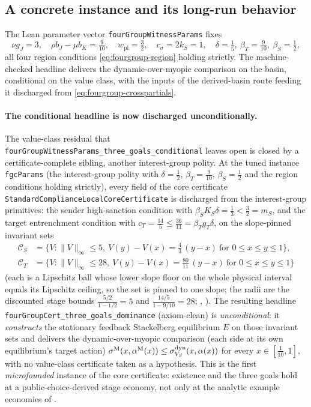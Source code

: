 \subsection{A concrete instance and its long-run behavior}
\label{sec:fourgroup:instance}

The Lean parameter vector \texttt{fourGroupWitnessParams} fixes
\begin{equation}
\nu g_J=3,
\quad
\rho b_J-\mu b_K=\tfrac{9}{10},
\quad
w_{\mathrm{pl}}=\tfrac{3}{2},
\quad
c_\sigma=2k_S=1,
\quad
\delta=\tfrac15,\ \beta_T=\tfrac{9}{10},\ \beta_S=\tfrac12,
\end{equation}
all four region conditions \eqref{eq:fourgroup-region} holding
strictly. The
machine-checked headline
 delivers
the dynamic-over-myopic comparison on the basin, conditional on the value class, with
the inputs of the derived-basin route feeding it discharged from
\eqref{eq:fourgroup-crosspartials}.

\paragraph{The conditional headline is now discharged unconditionally.}
The value-class residual that
\texttt{fourGroupWitnessParams\_three\_goals\_conditional} leaves open
is closed by a certificate-complete sibling, another interest-group
polity. At the tuned instance \texttt{fgcParams} (the
\citet{GrossmanHelpman1994} interest-group polity with $\delta=\tfrac12$,
$\beta_T=\tfrac{9}{10}$, $\beta_S=\tfrac12$ and the region conditions
holding strictly), every field of the core certificate
\texttt{StandardComplianceLocalCoreCertificate} is discharged from the
interest-group primitives: the sender high-sanction condition with
$\beta_S K_S\delta=\tfrac13<\tfrac32=m_S$, and the target entrenchment condition
with $c_T=\tfrac{14}{5}\le\tfrac{36}{11}=\beta_T g_T\delta$, on the
slope-pinned invariant sets
\begin{align*}
\mathcal C_S&=\{V:\lVert V\rVert_\infty\le 5,\ V(y)-V(x)=\tfrac43\,(y-x)\ \text{for } 0\le x\le y\le1\},\\
\mathcal C_T&=\{V:\lVert V\rVert_\infty\le 28,\ V(y)-V(x)=\tfrac{80}{11}\,(y-x)\ \text{for } 0\le x\le y\le1\}
\end{align*}
(each is a Lipschitz ball whose lower slope floor on the whole physical
interval equals its Lipschitz ceiling, so the set is pinned to one slope;
the radii are the discounted stage bounds $\tfrac{5/2}{1-1/2}=5$ and
$\tfrac{14/5}{1-9/10}=28$; , ).
The resulting headline
\texttt{fourGroupCert\_three\_goals\_dominance} (axiom-clean) is
\emph{unconditional}: it \emph{constructs} the stationary feedback
Stackelberg equilibrium $E$ on those invariant sets and delivers the
dynamic-over-myopic comparison (each side at its own equilibrium's target
action) $\sigma^{\mathrm{M}}(x,\alpha^{\mathrm{M}}(x))\le\sigma^{\mathrm{dyn}}_{V_S}(x,\alpha(x))$ for every
$x\in[\tfrac1{10},1]$, with no value-class certificate taken as a
hypothesis. This is the first \emph{microfounded} instance of the core
certificate: existence and the three goals hold at a
public-choice-derived stage economy, not only at the analytic
example economies of .


